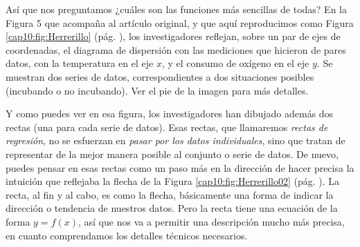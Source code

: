 Así que nos preguntamos ¿cuáles son las funciones más sencillas de todas?  En la Figura 5 que acompaña al artículo original, y que aquí reproducimos como Figura \ref{cap10:fig:Herrerillo} (pág. \pageref{cap10:fig:Herrerillo}), los investigadores reflejan, sobre un par de ejes de coordenadas, el diagrama de dispersión con las mediciones que hicieron de pares datos, con la temperatura en el eje $x$, y el consumo de  oxígeno en el eje $y$. Se muestran dos series de datos, correspondientes a dos situaciones posibles (incubando o no incubando). Ver el pie de la imagen para más detalles.

Y como puedes ver en esa figura, los investigadores han dibujado además dos rectas (una para cada serie de datos). Esas rectas, que llamaremos {\em rectas de regresión}, no se esfuerzan en {\em pasar por los datos individuales}, sino que tratan de representar de la mejor manera posible al conjunto o serie de datos. De nuevo, puedes pensar en esas rectas como un paso más en la dirección de hacer precisa la intuición que reflejaba la flecha de la Figura \ref{cap10:fig:Herrerillo02} (pág. \pageref{cap10:fig:Herrerillo02}). La recta, al fin y al cabo, es como la flecha, básicamente una forma de indicar la dirección o tendencia de nuestros datos. Pero la recta tiene una ecuación de la forma $y=f(x)$, así que nos va a permitir una descripción mucho más precisa, en cuanto comprendamos los detalles técnicos necesarios.

